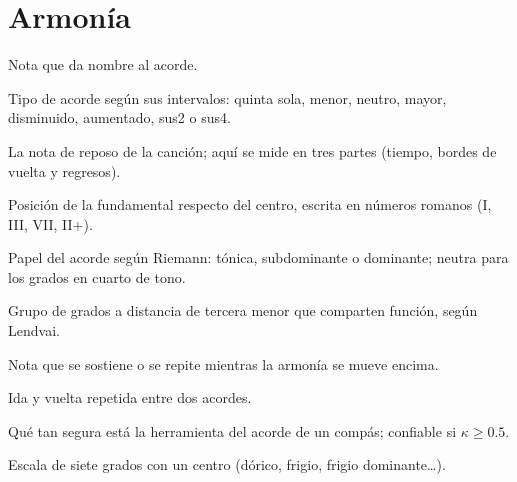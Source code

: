 \section*{Armonía}
\begin{description}[style=nextline,leftmargin=1.2em]
  \item[Fundamental] Nota que da nombre al acorde.
  \item[Calidad] Tipo de acorde según sus intervalos: quinta sola, menor, neutro, mayor, disminuido, aumentado, sus2 o
  sus4.
  \item[Centro] La nota de reposo de la canción; aquí se mide en tres partes (tiempo, bordes de vuelta y regresos).
  \item[Grado y cifrado] Posición de la fundamental respecto del centro, escrita en números romanos (I, \fl III, \fl VII,
  \fl II+).
  \item[Función] Papel del acorde según Riemann: tónica, subdominante o dominante; neutra para los grados en cuarto de tono.
  \item[Eje] Grupo de grados a distancia de tercera menor que comparten función, según Lendvai.
  \item[Pedal] Nota que se sostiene o se repite mientras la armonía se mueve encima.
  \item[Vaivén] Ida y vuelta repetida entre dos acordes.
  \item[Confianza $\kappa$] Qué tan segura está la herramienta del acorde de un compás; confiable si $\kappa \ge 0.5$.
  \item[Modo] Escala de siete grados con un centro (dórico, frigio, frigio dominante\dots).
\end{description}

